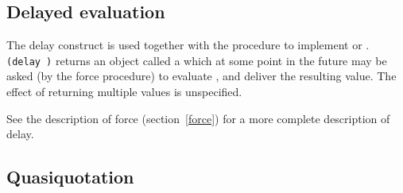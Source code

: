 \subsection{Delayed evaluation}\unsection

\begin{entry}{%
}


The {\cf delay} construct is used together with the procedure  to
implement  or .
{\tt(delay~)} returns an object called a
 which at some point in the future may be asked (by
the {\cf force} procedure)  to evaluate
, and deliver the resulting value.
The effect of  returning multiple values
is unspecified.

See the description of {\cf force} (section~\ref{force}) for a
more complete description of {\cf delay}.

\end{entry}


\subsection{Quasiquotation}\unsection
\label{quasiquotesection}

